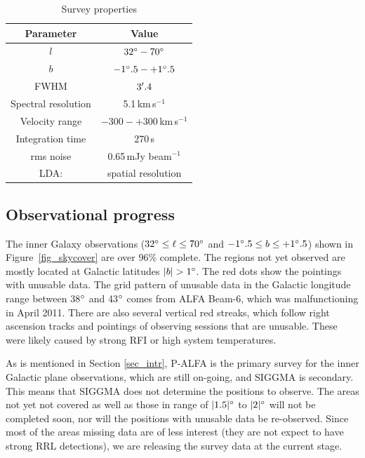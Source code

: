 \documentclass[manuscript]{aastex61}
\newcommand{\kms}{\,km\,s$^{-1}$}
\begin{document}
\begin{table}[tbhp]
\centering
\caption{Survey properties \label{tab_survey}}
\begin{threeparttable}
\begin{tabular}{cc}
\hline
\hline
 Parameter & Value\\
\hline
$l$  & $32\mbox{$^\circ$} - 70\mbox{$^\circ$}$ \\
$b$  & $-1\mbox{$^\circ$}.5 - +1\mbox{$^\circ$}.5$ \\
FWHM & $3\mbox{$^\prime$}.4$ \\
Spectral resolution & 5.1\kms \\
Velocity range & $-300 - +300$\kms\\
Integration time & 270\,s \\
rms noise & 0.65\,mJy beam$^{-1}$ \\
LDA: &spatial resolution
\hline
\end{tabular}
\end{threeparttable}
\end{table}

\subsection{Observational progress} \label{sec_obs}
The inner Galaxy observations ($32\mbox{$^\circ$} \le \ell \le 70 \mbox{$^\circ$}$ and $-1\mbox{$^\circ$}.5 \le b \le +1\mbox{$^\circ$}.5$) shown in Figure~\ref{fig_skycover} are over 96\% complete.
The regions not yet observed are mostly located at Galactic latitudes $|b|>1\degr$.  The red dots show the pointings with unusable data.  The grid pattern of unusable data in the Galactic longitude range between 38$\mbox{$^\circ$}$ and 43$\mbox{$^\circ$}$ comes from ALFA Beam-6, which was malfunctioning in April 2011.
There are also several vertical red streaks, which follow right ascension tracks and pointings of observing sessions that are unusable.
These were likely caused by strong RFI or high system temperatures.

As is mentioned in Section \ref{sec_intr}, P-ALFA is the primary survey for the inner Galactic plane observations, which are still on-going, and SIGGMA is secondary.  This means that SIGGMA does not determine the positions to observe.
The areas not yet not covered as well as those in range of $|1.5|\mbox{$^\circ$}$ to $|2|\mbox{$^\circ$}$ will not be completed soon, nor will the positions with unusable data be re-observed.
Since most of the areas missing data are of less interest (they are not expect to have strong RRL detections), we are releasing the survey data at the current stage.
\end{document}
